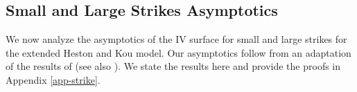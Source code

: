 \documentclass[11pt]{article}
\numberwithin{equation}{section}
\numberwithin{theorem}{section}
\begin{document}
\subsection{Small and Large Strikes   Asymptotics\label{sub:IV_asy}}\label{sect-IVasy}
We now  analyze the asymptotics of the IV surface for small
and large strikes for the extended Heston  and Kou model.  Our asymptotics  follow from  an adaptation  of the results of \citet{Benaim2008} (see also \citet{Benaim2008a}). We state the results here  and provide the proofs in Appendix \ref{app-strike}.



\end{document}
